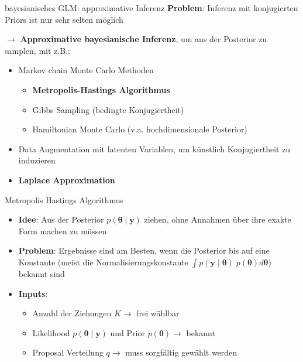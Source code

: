 \documentclass[
  ignorenonframetext,
  aspectratio=169,
]{beamer}
\providecommand{\tightlist}{%
  \setlength{\itemsep}{0pt}\setlength{\parskip}{0pt}}
\newcommand{\by}{\bm{y}}
\newcommand{\btheta}{\bm{\theta}}
\begin{document}
\begin{frame}{bayesianisches GLM: approximative Inferenz}
\protect{}\label{bayesianisches-glm-approximative-inferenz}
\textbf{Problem}: Inferenz mit konjugierten Priors ist nur sehr selten
möglich \autocite{polson_bayesian_2013}

\(\to\) \textbf{Approximative bayesianische Inferenz}, um aus der
Posterior zu samplen, mit z.B.:

\begin{itemize}
\tightlist
\item
  Markov chain Monte Carlo Methoden

  \begin{itemize}
  \tightlist
  \item
    \textbf{Metropolis-Hastings Algorithmus}
    \autocite{hastings_monte_1970}
  \item
    Gibbs Sampling (bedingte Konjugiertheit)
    \autocite{dellaportas_bayesian_1993}
  \item
    Hamiltonian Monte Carlo (v.a. hochdimensionale Posterior)
    \autocite{neal_probabilistic_1993}
  \end{itemize}
\item
  Data Augmentation mit latenten Variablen, um künstlich Konjugiertheit
  zu induzieren
  \autocite{albert_bayesian_1993,holmes_efficient_nodate,fruhwirth-schnatter_auxiliary_2007,scott_data_2011}
\item
  \textbf{Laplace Approximation} \autocite{tierney_accurate_1986}
\end{itemize}
\end{frame}

\begin{frame}{Metropolis Hastings Algorithmus
\autocite{hastings_monte_1970}}
\protect{}\label{metropolis-hastings-algorithmus-hastings_monte_1970}
\begin{itemize}
\item
  \textbf{Idee}: Aus der Posterior \(p(\btheta\mid \by)\) ziehen, ohne
  Annahmen über ihre exakte Form machen zu müssen
\item
  \textbf{Problem}: Ergebnisse sind am Besten, wenn die Posterior bis
  auf eine Konstante (meist die Normalisierungskonstante
  \(\int p(\by \mid \btheta) \; p(\btheta) d \btheta\)) bekannt sind
\item
  \textbf{Inputs}:

  \begin{itemize}
  \tightlist
  \item
    Anzahl der Ziehungen \(K \to\) frei wählbar
  \item
    Likelihood \(p(\btheta \mid \by)\) und Prior \(p(\btheta) \to\)
    bekannt
  \item
    Proposal Verteilung \(q \to\) muss sorgfältig gewählt werden
  \end{itemize}
\end{itemize}
\end{frame}
\end{document}
